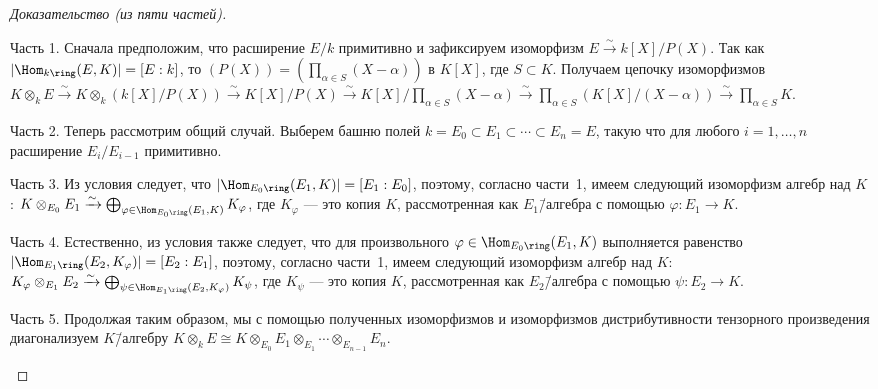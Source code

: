 \documentclass[
	extrafontsizes,
	11pt,
	hyphens,
]{memoir}
\begin{document}
\begin{proof}[Доказательство (из пяти частей)]
~\begin{proofdescription}

\item[Часть 1.]
Сначала предположим, что расширение \(E/k\) примитивно и зафиксируем изоморфизм
\(E \xrightarrow{\sim} k[X]/P(X)\).
Так как
\(\lvert \Hom_{k\ring}(E,K) \rvert = [E : k]\),
то \((P(X)) = (\prod_{\alpha \in S} (X - \alpha))\) в \(K[X]\), где \(S \subset K\).
Получаем цепочку изоморфизмов
\(
K \otimes_k E
\xrightarrow{\sim}
K \otimes_k (k[X]/P(X))
\xrightarrow{\sim}
K[X]/P(X)
\xrightarrow{\sim}
K[X]/\prod_{\alpha \in S} (X - \alpha)
\xrightarrow{\sim}
\prod_{\alpha \in S} (K[X]/(X - \alpha))
\xrightarrow{\sim}
\prod_{\alpha \in S} K
\).

\item[Часть 2.]
Теперь рассмотрим общий случай.
Выберем башню полей
\(k = E_0 \subset E_1 \subset \cdots{} \subset E_n = E\),
такую что для любого \(i = 1, \dots{}, n\) расширение \(E_i / E_{i-1}\) примитивно.

\item[Часть 3.]
Из условия следует, что
\(\lvert \Hom_{E_0\ring}(E_1,K) \rvert = [E_1 : E_0]\),
поэтому, согласно
части~1,
имеем следующий изоморфизм
алгебр над \(K\):
\(K \otimes_{E_0} E_1 \xrightarrow{\sim} \bigoplus_{\varphi \in \Hom_{E_0\ring}(E_1,K)} K_\varphi\),
где \(K_\varphi\) --- это копия \(K\), рассмотренная как \(E_1\)\=/алгебра с помощью \(\varphi : E_1 \to K\).

\item[Часть 4.]
Естественно, из условия также следует, что для произвольного \(\varphi \in \Hom_{E_0\ring}(E_1,K)\)
выполняется равенство
\(\lvert \Hom_{E_1\ring}(E_2,K_\varphi) \rvert = [E_2 : E_1]\),
поэтому, согласно
части~1,
имеем следующий изоморфизм
алгебр над \(K\):
\(K_\varphi \otimes_{E_1} E_2 \xrightarrow{\sim} \bigoplus_{\psi \in \Hom_{E_1\ring}(E_2,K_\varphi)} K_\psi\),
где \(K_\psi\) --- это копия \(K\), рассмотренная как \(E_2\)\=/алгебра с помощью \(\psi : E_2 \to K\).

\item[Часть 5.]
Продолжая таким образом, мы с помощью полученных изоморфизмов и изоморфизмов дистрибутивности тензорного произведения диагонализуем \(K\)\=/алгебру
\(
K \otimes_k E \cong
K \otimes_{E_0} E_1 \otimes_{E_1} \cdots{} \otimes_{E_{n-1}} E_n
\).
\qedhere

\end{proofdescription}
\end{proof}
\end{document}
